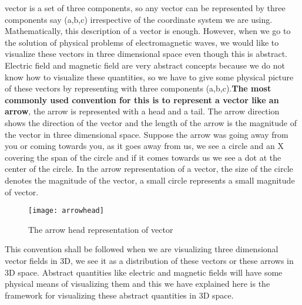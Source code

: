 	  vector is a set of three components, so any vector can be represented by three components say (a,b,c) irrespective of the coordinate system we are using. Mathematically, this description of a vector is enough. However, when we go to the solution of physical problems of electromagnetic waves, we would like to visualize these vectors in three dimensional space even though this is abstract. Electric field and magnetic field are very abstract concepts because we do not know how to visualize these quantities, so we have to give some physical picture of these vectors by representing with three components (a,b,c).\textbf{The most commonly used convention for this is to represent a vector like an arrow}, the arrow  is represented with a head and a tail. The arrow direction shows the direction of the vector and the length of the arrow is the magnitude of the vector in three dimensional space. Suppose the arrow was going away from you or coming towards you, as it goes away from us, we see a circle and an \textgravedbl X \textacutedbl covering the span of the circle and if it comes towards us we see a dot at the center of the circle. In the arrow representation of a vector, the size of the circle denotes the magnitude of the vector, a small circle represents a small magnitude of vector.
	  \begin{figure}[h]
	 	\centering
	 	\texttt{[image: arrowhead]}
	 	\caption{The arrow head representation of vector}
	 \end{figure}
	  This convention shall be followed when we are visualizing three dimensional vector fields in 3D, we see it as a distribution of these vectors or these arrows in 3D space. Abstract quantities like electric and magnetic fields will have some physical means of visualizing them and this we have explained here is the framework for visualizing these abstract quantities in 3D space.  
